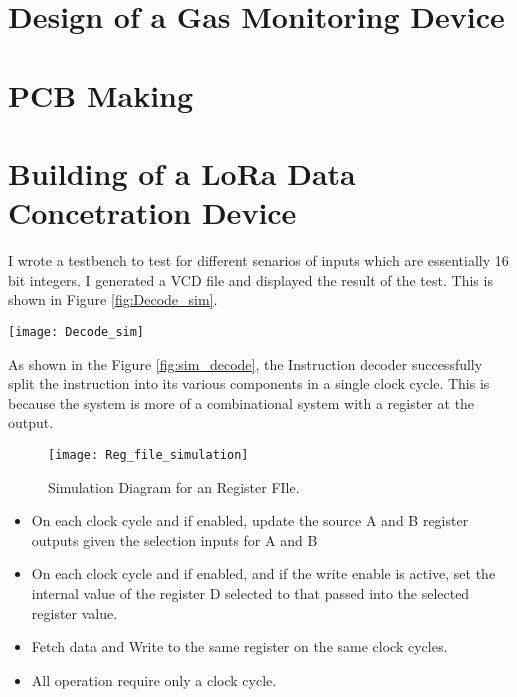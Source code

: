 \section{Design of a Gas Monitoring Device} 



\section{PCB Making} 

\section{Building of a LoRa Data Concetration Device}

I wrote a testbench to test for different senarios of inputs which are essentially 16 bit integers. I generated a VCD file and displayed the result of the test. This is shown in Figure \ref{fig:Decode_sim}.

\begin{sidewaysfigure}[p]
    \centering
    \texttt{[image: Decode\_sim]}
	\caption{Simulation Diagram for an Instruction Decoder.}
    \label{fig:sim_decode}
\end{sidewaysfigure}

As shown in the  Figure \ref{fig:sim_decode}, the Instruction decoder successfully split the instruction into its various components in a single clock cycle. This is because the system is more of a combinational system with a register at the output.




\begin{figure}[p]
    \centering
    \texttt{[image: Reg\_file\_simulation]}
	\caption{Simulation Diagram for an Register FIle.}
    \label{fig:reg_sim}
\end{figure}

\begin{itemize}
\item On each clock cycle and if enabled, update the source A and B register outputs given the selection inputs for A and B
\item On each clock cycle and if enabled, and if the write enable is active, set the internal value of the register D selected to that passed into the selected register value.
\item Fetch data and Write to the same register on the same clock cycles.
\item All operation require only a clock cycle.
\end{itemize} 
